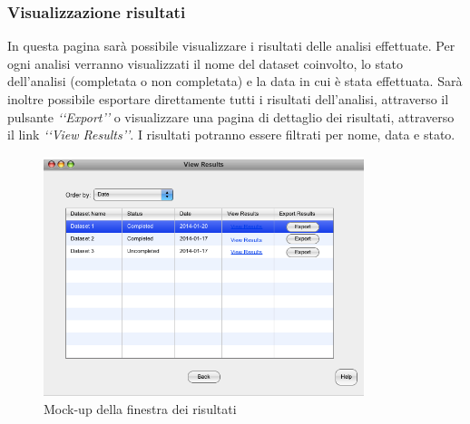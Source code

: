 \subsubsection{Visualizzazione risultati}
In questa pagina sarà possibile visualizzare i risultati delle analisi effettuate. Per ogni analisi verranno visualizzati il nome del dataset\glossario{} coinvolto, lo stato dell'analisi (completata o non completata) e la data in cui è stata effettuata. 
Sarà inoltre possibile esportare direttamente tutti i risultati dell'analisi, attraverso il pulsante \textit{\lq\lq Export\rq\rq} o visualizzare una pagina di dettaglio dei risultati, attraverso il link \textit{\lq\lq View Results\rq\rq}.
I risultati potranno essere filtrati per nome, data e stato.
\begin{figure}[htp]
	\centering
	\includegraphics[width=0.8\linewidth,height=7cm]{./Content/Immagini/Prototype-v0.1/filesystemdoc_8_12}
	\caption{Mock-up della finestra dei risultati}
	\label{list_results}
\end{figure}

